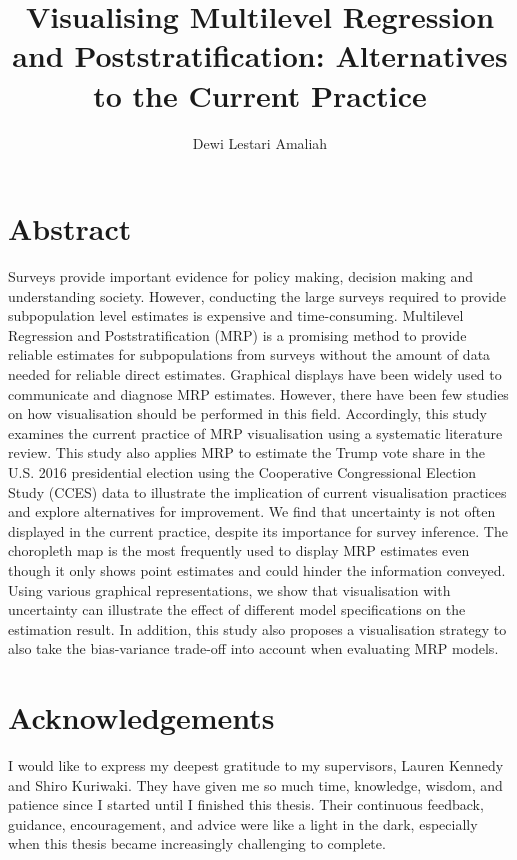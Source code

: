 \documentclass{monashthesis}
\author{Dewi Lestari Amaliah}
\title{Visualising Multilevel Regression and Poststratification: Alternatives to the Current Practice}
\begin{document}

\titlepage

{\sf\tighttoc\doublespacing}

\clearpage{}\setcounter{page}{0}

\hypertarget{abstract}{%
\chapter*{Abstract}\label{abstract}}

Surveys provide important evidence for policy making, decision making and understanding society. However, conducting the large surveys required to provide subpopulation level estimates is expensive and time-consuming. Multilevel Regression and Poststratification (MRP) is a promising method to provide reliable estimates for subpopulations from surveys without the amount of data needed for reliable direct estimates. Graphical displays have been widely used to communicate and diagnose MRP estimates. However, there have been few studies on how visualisation should be performed in this field. Accordingly, this study examines the current practice of MRP visualisation using a systematic literature review. This study also applies MRP to estimate the Trump vote share in the U.S. 2016 presidential election using the Cooperative Congressional Election Study (CCES) data to illustrate the implication of current visualisation practices and explore alternatives for improvement. We find that uncertainty is not often displayed in the current practice, despite its importance for survey inference. The choropleth map is the most frequently used to display MRP estimates even though it only shows point estimates and could hinder the information conveyed. Using various graphical representations, we show that visualisation with uncertainty can illustrate the effect of different model specifications on the estimation result. In addition, this study also proposes a visualisation strategy to also take the bias-variance trade-off into account when evaluating MRP models.\\
\newpage

\hypertarget{acknowledgements}{%
\chapter*{Acknowledgements}\label{acknowledgements}}

I would like to express my deepest gratitude to my supervisors, Lauren Kennedy and Shiro Kuriwaki. They have given me so much time, knowledge, wisdom, and patience since I started until I finished this thesis. Their continuous feedback, guidance, encouragement, and advice were like a light in the dark, especially when this thesis became increasingly challenging to complete.
\end{document}
